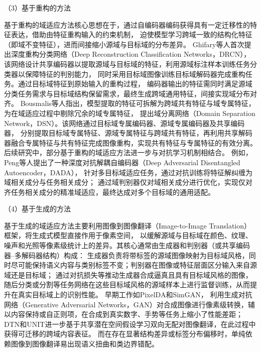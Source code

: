（3）基于重构的方法

基于重构的域适应方法核心思想在于，通过自编码器编码获得具有一定迁移性的特征表达，借助由特征重构输入的约束机制，
迫使模型学习跨域一致的结构化特征（即域不变特征），进而间接缩小源域与目标域的分布差异。
Ghifary等人\cite{ghifary2016deep}首次提出深度重构分类网络（Deep Reconstruction Classification Networks，DRCN），
该网络设计共享编码器以提取源域与目标域的特征，利用源域标注样本训练任务分类器以保障特征的判别能力，
同时采用目标域图像训练目标域解码器完成重构任务。通过目标域特征到原始输入的重构过程，
编码器输出的特征需同时满足源域分类任务需求与目标域结构保留需求，最终生成跨域通用特征，间接实现域分布对齐。
Bousmalis等人\cite{bousmalis2016domain}指出，模型提取的特征可拆解为跨域共有特征与域专属特征，为在域适应过程中剔除冗余的域专属特征，
提出域分离网络（Domain Separation Network，DSN）。该网络通过目标域专属编码器、源域专属编码器及共享编码器，
分别提取目标域专属特征、源域专属特征与跨域共有特征，再利用共享解码器融合专属特征与共有特征完成图像重构，实现共有特征与专属特征的有效分离。
后续研究中，部分基于重构的域适应方法进一步与对抗学习机制相结合。
例如，Peng等人\cite{peng2019domain}提出了一种深度对抗解耦自编码器（Deep Adversarial Disentangled Autoencoder，DADA），
针对多目标域适应任务，通过对抗训练将特征解纠缠为域相关成分与任务相关成分；
通过域判别器仅对域相关成分进行优化，实现仅对齐任务相关成分的精准域适应，最终达成对多个目标域的通用适配。



（4）基于生成的方法

基于生成的域适应方法主要利用图像到图像翻译（Image-to-Image Translation）框架，将生成式模型直接作用于像素空间，
以缓解源域与目标域在颜色、纹理、噪声和光照等像素级统计上的差异。其核心通常由生成器和判别器（或共享编码器–多解码器结构）构成：
生成器负责将带标签的源域图像映射为目标域风格，同时尽可能保持语义内容与类别标签不变；判别器在图像或特征层面区分输入来自源域还是目标域；
通过对抗损失等推动生成器合成逼真且具有目标域风格的图像，随后分类或分割等任务网络在这些目标域风格的源域样本上进行监督训练，从而提升在真实目标域上的识别性能。
早期工作如PixelDA\cite{bousmalis2016unsupervised}和SimGAN\cite{shrivastava2017learning}，
利用生成对抗网络（Generative Adversarial Networks，GAN）\cite{goodfellow2014generative}对合成图像进行像素级转换，辅以内容保持或自正则项，在合成到真实数字、手势等任务上缩小了性能差距；
DTN\cite{taigman2016unsupervised}和UNIT\cite{liu2017unsupervised}进一步基于共享潜在空间假设学习双向无配对图像翻译，在此过程中获得可迁移的跨域内容表征。
而在存在显著结构差异或标签分布偏移时，单纯依赖图像到图像翻译易出现语义扭曲和类边界错配。

